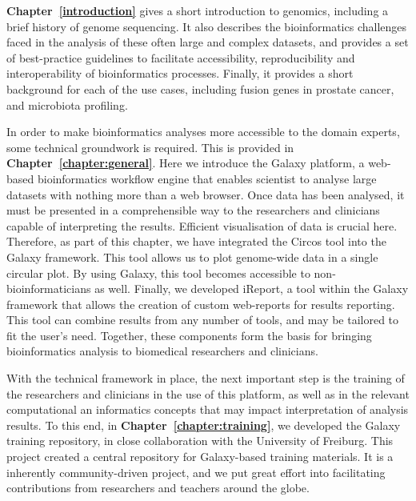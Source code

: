 \textbf{Chapter~\ref{introduction}} gives a short introduction to genomics, including a brief history of genome sequencing. It also describes the bioinformatics challenges faced in the analysis of these often large and complex datasets, and provides a set of best-practice guidelines to facilitate accessibility, reproducibility and interoperability of bioinformatics processes. Finally, it provides a short background for each of the use cases, including fusion genes in prostate cancer, and microbiota profiling.

In order to make bioinformatics analyses more accessible to the domain experts, some technical groundwork is required. This is provided in
\textbf{Chapter~\ref{chapter:general}}. Here we introduce the Galaxy platform, a web-based bioinformatics workflow engine that enables scientist to analyse large datasets with nothing more than a web browser.
Once data has been analysed, it must be presented in a comprehensible way to the researchers and clinicians capable of interpreting the results. Efficient visualisation of data is crucial here.
Therefore, as part of this chapter, we have integrated the Circos tool into the Galaxy framework. This tool allows us to plot genome-wide data in a single circular plot. By using Galaxy, this tool becomes accessible to non-bioinformaticians as well.
Finally, we developed iReport, a tool within the Galaxy framework that allows the creation of custom web-reports for results reporting. This tool can combine results from any number of tools, and may be tailored to fit the user's need. Together, these components form the basis for bringing bioinformatics analysis to biomedical researchers and clinicians.

With the technical framework in place, the next important step is the training of the researchers and clinicians in the use of this platform, as well as in the relevant computational an informatics concepts that may impact interpretation of analysis results.
To this end, in \textbf{Chapter~\ref{chapter:training}}, we developed the Galaxy training repository, in close collaboration with the University of Freiburg. This project created a central repository for Galaxy-based training materials. It is a inherently community-driven project, and we put great effort into facilitating contributions from researchers and teachers around the globe.

